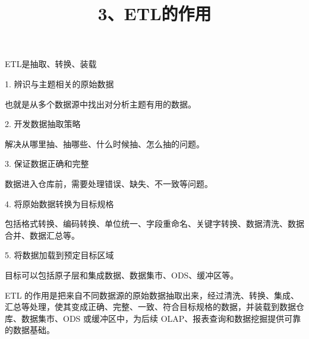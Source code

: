 \documentclass[UTF8,zihao=-4]{ctexart}
\begin{document}
\title{3、ETL的作用}
\author{}
\date{}
\maketitle

ETL是抽取、转换、装载\par

1. 辨识与主题相关的原始数据\par
也就是从多个数据源中找出对分析主题有用的数据。\par

2. 开发数据抽取策略\par
解决从哪里抽、抽哪些、什么时候抽、怎么抽的问题。\par

3. 保证数据正确和完整\par
数据进入仓库前，需要处理错误、缺失、不一致等问题。\par

4. 将原始数据转换为目标规格\par
包括格式转换、编码转换、单位统一、字段重命名、关键字转换、数据清洗、数据合并、数据汇总等。\par

5. 将数据加载到预定目标区域\par
目标可以包括原子层和集成数据、数据集市、ODS、缓冲区等。\par

ETL 的作用是把来自不同数据源的原始数据抽取出来，经过清洗、转换、集成、汇总等处理，使其变成正确、完整、一致、符合目标规格的数据，并装载到数据仓库、数据集市、ODS 或缓冲区中，为后续 OLAP、报表查询和数据挖掘提供可靠的数据基础。\par
\end{document}

